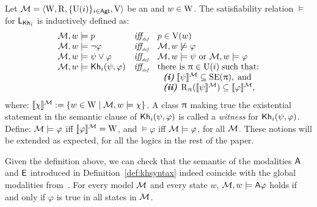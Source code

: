 \begin{definition}\label{def:sem-esm}
Let $\mathcal{M}=\langle \operatorname{W},\operatorname{R},\{\operatorname{U}(i)\}_{i\in{\rm \sf Agt}},\operatorname{V} \rangle$ be an \ults and $w \in \operatorname{W}$.
The satisfiability relation $\models$ for $\mathsf{L}_{{\sf Kh}_i}$ is inductively defined as:
\[
\begin{array}{l@{\ \ \ }c@{\ \ \  }l}
\modults, w \models p & \iffdef & p \in \V(w) \\
\modults, w \models \neg\varphi & \iffdef & \modults, w \not\models \varphi \\
\modults, w \models \psi\vee\varphi & \iffdef & \modults, w \models \psi \mbox{ or }\modults, w \models \varphi \\
\modults, w \models \khi(\psi,\varphi) & \iffdef & \text{there is } \plans \in \Unc(i) \;\text{such that:} \\
& & \ \ \text{\bfseries \itshape (i)} \; \truthset{\modults}{\psi} \subseteq \stexec(\plans),\; \text{and} \\
& & \ \ \text{\bfseries \itshape (ii)} \; \R_\plans(\truthset{\modults}{\psi}) \subseteq \truthset{\modults}{\varphi},
\end{array}
\]
where: $\llbracket \chi \rrbracket^{\mathcal{M}} := \{ w\in\operatorname{W} \mid \mathcal{M},w\models\chi \}$. 
A class $\uppi$ making true the existential statement in the semantic clause of ${\sf Kh}_i(\psi,\varphi)$ is called a \emph{witness} for ${\sf Kh}_i(\psi,\varphi)$. 
Define: $\mathcal{M}\models\varphi$ iff  $\llbracket \varphi \rrbracket^{\mathcal{M}}=\operatorname{W}$, and $\models\varphi$ iff $\mathcal{M}\models\varphi$, for all \ults $\mathcal{M}$. These notions will be extended as expected, for all the logics in the rest of the paper.
\end{definition}

\medskip

Given the definition above, we can check that the semantic of the modalities ${\sf A}$ and ${\sf E}$ introduced in Definition~\ref{def:khsyntax} indeed coincide with the global modalities from~\cite{GorankoP92}. For every model $\mathcal{M}$ and every state $w$, $\mathcal{M},w\models{\sf A}\varphi$ holds if and only if $\varphi$ is true in all states in $\mathcal{M}$. %

\medskip


